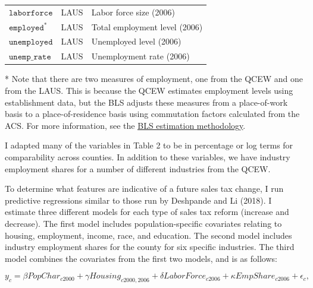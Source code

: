 \documentclass[]{article}
\begin{document}
\begin{table}
\begin{threeparttable}
\begin{tabular}[t]{lll}
$\texttt{laborforce}$ & LAUS & Labor force size (2006)\\
\addlinespace
$\texttt{employed}^{\text{*}}$ & LAUS & Total employment level (2006)\\
$\texttt{unemployed}$ & LAUS & Unemployed level (2006)\\
$\texttt{unemp\_rate}$ & LAUS & Unemployment rate (2006)\\
\bottomrule
\end{tabular}
\begin{tablenotes}
\item[*] Note that there are two measures of employment, one from the QCEW and one from the LAUS. This is because the QCEW estimates employment levels using establishment data, but the BLS adjusts these measures from a place-of-work basis to a place-of-residence basis using commutation factors calculated from the ACS. For more information, see the \href{https://www.bls.gov/lau/laumthd.htm}{\underline{BLS estimation methodology}}.
\end{tablenotes}
\end{threeparttable}
\end{table}

I adapted many of the variables in Table 2 to be in percentage or log
terms for comparability across counties. In addition to these variables,
we have industry employment shares for a number of different industries
from the QCEW.

To determine what features are indicative of a future sales tax change,
I run predictive regressions similar to those run by Deshpande and Li
(2018). I estimate three different models for each type of sales tax
reform (increase and decrease). The first model includes
population-specific covariates relating to housing, employment, income,
race, and education. The second model includes industry employment
shares for the county for six specific industries. The third model
combines the covariates from the first two models, and is as follows:

\[
y_{c} = \beta PopChar_{c2000} + \gamma Housing_{c2000,2006} + \delta LaborForce_{c2006} + \kappa EmpShare_{c2006} + \epsilon_{c},
\]
\end{document}
